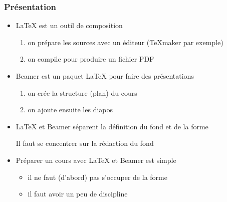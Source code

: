 
\begin{frame}
  \frametitle{Présentation}

  \begin{itemize}
  \item \LaTeX{} est un outil de composition
    
    \begin{enumerate}
    \item on prépare les sources avec un éditeur (\TeX{}maker par exemple)
    \item on compile pour produire un fichier PDF
    \end{enumerate}

    \pause
    
  \item Beamer est un paquet \LaTeX{} pour faire des présentations
    
    \begin{enumerate}
    \item on crée la structure (plan) du cours
    \item on ajoute ensuite les diapos
    \end{enumerate}

    \pause

  \item \LaTeX{} et Beamer séparent la définition du fond et de la forme
    \begin{center}
      \begin{alertenv}
        Il faut se concentrer sur la rédaction du fond
      \end{alertenv}
    \end{center}

    \pause

  \item Préparer un cours avec \LaTeX{} et Beamer est simple

    \begin{itemize}
    \item il ne faut (d'abord) pas s'occuper de la forme
    \item il faut avoir un peu de \alert{discipline}
    \end{itemize}
  \end{itemize}
\end{frame}


